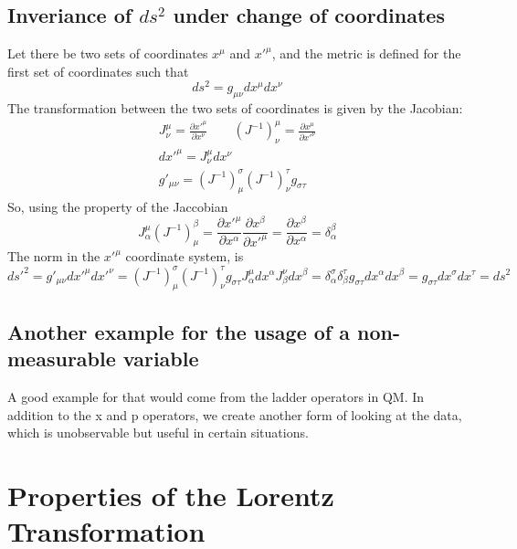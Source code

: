 \documentclass{article}
\begin{document}
\subsection{Inveriance of $ds^2$ under change of coordinates}
Let there be two sets of coordinates $x^\mu$ and ${x'}^\mu$, and the metric is defined for the first set of coordinates such that
\begin{equation}
    ds^2 = g_{\mu\nu}dx^{\mu}dx^{\nu}
\end{equation}
The transformation between the two sets of coordinates is given by the Jacobian:
\begin{equation}
\begin{gathered}
    J^\mu_\nu = \frac{\partial x'^\mu}{\partial x^\nu} \qquad
    \left(J^{-1}\right)^\mu_\nu = \frac{\partial x^\mu}{\partial x'^\nu}
    \\
    dx'^\mu = J^\mu_\nu dx^\nu \\
    g'_{\mu\nu} = \left(J^{-1}\right)^\sigma_\mu \left(J^{-1}\right)^\tau_\nu g_{\sigma\tau}
\end{gathered}
\end{equation}
So, using the property of the Jaccobian
\begin{equation}
    J^\mu_\alpha \left(J^{-1}\right)^\beta_\mu = \frac{\partial x'^\mu}{\partial x^\alpha} \frac{\partial x^\beta}{\partial x'^\mu} = 
    \frac{\partial x^\beta}{\partial x^\alpha} = \delta^\beta_\alpha
\end{equation}
The norm in the $x'^\mu$ coordinate system, is
\begin{equation}
    ds'^2 = g'_{\mu\nu}dx'^\mu dx'^\nu = \left(J^{-1}\right)^\sigma_\mu \left(J^{-1}\right)^\tau_\nu g_{\sigma\tau} J_\alpha^\mu dx^\alpha J_\beta^\nu dx^\beta = \delta^\sigma_{\alpha} \delta^\tau_\beta g_{\sigma\tau} dx^\alpha dx^\beta = g_{\sigma\tau} dx^\sigma dx^\tau = ds^2
\end{equation}
\subsection{Another example for the usage of a non-measurable variable}
A good example for that would come from the ladder operators in QM. In addition to the x and p operators, we create another form of looking at the data, which is unobservable but useful in certain situations.
\section{Properties of the Lorentz Transformation}
\end{document}

